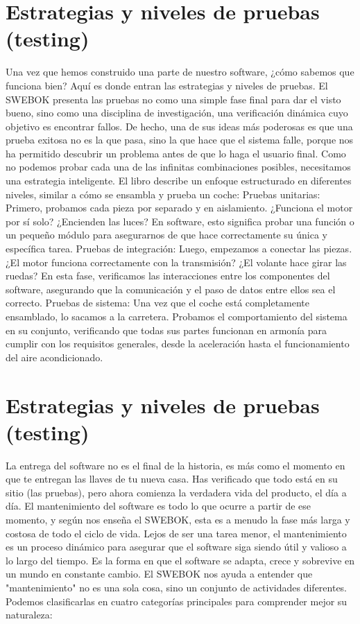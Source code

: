 \section{Estrategias y niveles de pruebas (testing)}
Una vez que hemos construido una parte de nuestro software, ¿cómo sabemos que funciona bien? Aquí es donde entran las estrategias y niveles de pruebas. El SWEBOK presenta las pruebas no como una simple fase final para dar el visto bueno, sino como una disciplina de investigación, una verificación dinámica cuyo objetivo es encontrar fallos. De hecho, una de sus ideas más poderosas es que una prueba exitosa no es la que pasa, sino la que hace que el sistema falle, porque nos ha permitido descubrir un problema antes de que lo haga el usuario final.
Como no podemos probar cada una de las infinitas combinaciones posibles, necesitamos una estrategia inteligente. El libro describe un enfoque estructurado en diferentes niveles, similar a cómo se ensambla y prueba un coche:
Pruebas unitarias: Primero, probamos cada pieza por separado y en aislamiento. ¿Funciona el motor por sí solo? ¿Encienden las luces? En software, esto significa probar una función o un pequeño módulo para asegurarnos de que hace correctamente su única y específica tarea.
Pruebas de integración: Luego, empezamos a conectar las piezas. ¿El motor funciona correctamente con la transmisión? ¿El volante hace girar las ruedas? En esta fase, verificamos las interacciones entre los componentes del software, asegurando que la comunicación y el paso de datos entre ellos sea el correcto.
Pruebas de sistema: Una vez que el coche está completamente ensamblado, lo sacamos a la carretera. Probamos el comportamiento del sistema en su conjunto, verificando que todas sus partes funcionan en armonía para cumplir con los requisitos generales, desde la aceleración hasta el funcionamiento del aire acondicionado.
\section{Estrategias y niveles de pruebas (testing)}
La entrega del software no es el final de la historia, es más como el momento en que te entregan las llaves de tu nueva casa. Has verificado que todo está en su sitio (las pruebas), pero ahora comienza la verdadera vida del producto, el día a día. El mantenimiento del software es todo lo que ocurre a partir de ese momento, y según nos enseña el SWEBOK, esta es a menudo la fase más larga y costosa de todo el ciclo de vida.
Lejos de ser una tarea menor, el mantenimiento es un proceso dinámico para asegurar que el software siga siendo útil y valioso a lo largo del tiempo. Es la forma en que el software se adapta, crece y sobrevive en un mundo en constante cambio.
El SWEBOK nos ayuda a entender que "mantenimiento" no es una sola cosa, sino un conjunto de actividades diferentes. Podemos clasificarlas en cuatro categorías principales para comprender mejor su naturaleza:

